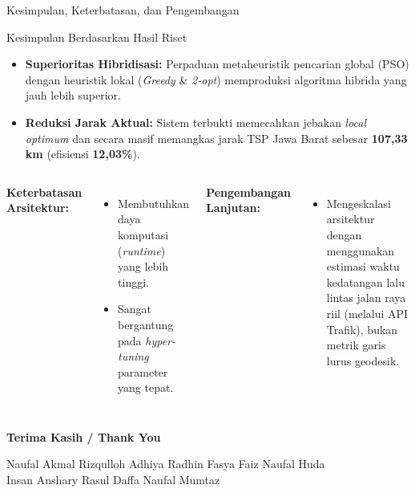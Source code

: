 \documentclass[aspectratio=169,10pt]{beamer}
\begin{document}
\begin{frame}{Kesimpulan, Keterbatasan, dan Pengembangan}
  \begin{block}{Kesimpulan Berdasarkan Hasil Riset}
    \begin{itemize}
      \item \textbf{Superioritas Hibridisasi:} Perpaduan metaheuristik pencarian global (PSO) dengan heuristik lokal (\textit{Greedy} \& \textit{2-opt}) memproduksi algoritma hibrida yang jauh lebih superior.
      \item \textbf{Reduksi Jarak Aktual:} Sistem terbukti memecahkan jebakan \textit{local optimum} dan secara masif memangkas jarak TSP Jawa Barat sebesar \textbf{107,33 km} (efisiensi \textbf{12,03\%}).
    \end{itemize}
  \end{block}

  \begin{columns}[T]
    \textbf{Keterbatasan Arsitektur:}
    \begin{itemize}
      \item Membutuhkan daya komputasi (\textit{runtime}) yang lebih tinggi.
      \item Sangat bergantung pada \textit{hyper-tuning} parameter yang tepat.
    \end{itemize}
    
    \textbf{Pengembangan Lanjutan:}
    \begin{itemize}
      \item Mengeskalasi arsitektur dengan menggunakan estimasi waktu kedatangan lalu lintas jalan raya riil (melalui API Trafik), bukan metrik garis lurus geodesik.
    \end{itemize}
  \end{columns}
\end{frame}

\begin{frame}[plain]

  \vspace{1.8cm}
  \centering
  {\color{white}\Huge\bfseries Terima Kasih / Thank You}

  \vspace{1.3cm}
  {\color{white!55}\footnotesize
    Naufal Akmal Rizqulloh \quad Adhiya Radhin Fasya \quad Faiz Naufal Huda\\[4pt]
    Insan Anshary Rasul \quad Daffa Naufal Mumtaz
  }
\end{frame}
\end{document}
